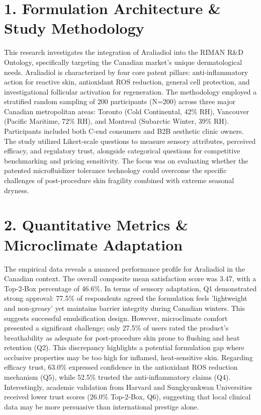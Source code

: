 \documentclass[10pt,twocolumn,a4paper]{article}
\begin{document}
\section{1. Formulation Architecture \& Study Methodology}
This research investigates the integration of Araliadiol into the RIMAN R\&D Ontology, specifically targeting the Canadian market's unique dermatological needs. Araliadiol is characterized by four core patent pillars: anti-inflammatory action for reactive skin, antioxidant ROS reduction, general cell protection, and investigational follicular activation for regeneration. The methodology employed a stratified random sampling of 200 participants (N=200) across three major Canadian metropolitan areas: Toronto (Cold Continental, 42\% RH), Vancouver (Pacific Maritime, 72\% RH), and Montreal (Subarctic Winter, 39\% RH). Participants included both C-end consumers and B2B aesthetic clinic owners. The study utilized Likert-scale questions to measure sensory attributes, perceived efficacy, and regulatory trust, alongside categorical questions for competitive benchmarking and pricing sensitivity. The focus was on evaluating whether the patented microfluidizer tolerance technology could overcome the specific challenges of post-procedure skin fragility combined with extreme seasonal dryness.
\section{2. Quantitative Metrics \& Microclimate Adaptation}
The empirical data reveals a nuanced performance profile for Araliadiol in the Canadian context. The overall composite mean satisfaction score was 3.47, with a Top-2-Box percentage of 46.6\%. In terms of sensory adaptation, Q1 demonstrated strong approval: 77.5\% of respondents agreed the formulation feels 'lightweight and non-greasy' yet maintains barrier integrity during Canadian winters. This suggests successful emulsification design. However, microclimate comfort presented a significant challenge; only 27.5\% of users rated the product's breathability as adequate for post-procedure skin prone to flushing and heat retention (Q2). This discrepancy highlights a potential formulation gap where occlusive properties may be too high for inflamed, heat-sensitive skin. Regarding efficacy trust, 63.0\% expressed confidence in the antioxidant ROS reduction mechanism (Q5), while 52.5\% trusted the anti-inflammatory claims (Q4). Interestingly, academic validation from Harvard and Sungkyunkwan Universities received lower trust scores (26.0\% Top-2-Box, Q6), suggesting that local clinical data may be more persuasive than international prestige alone.
\end{document}
